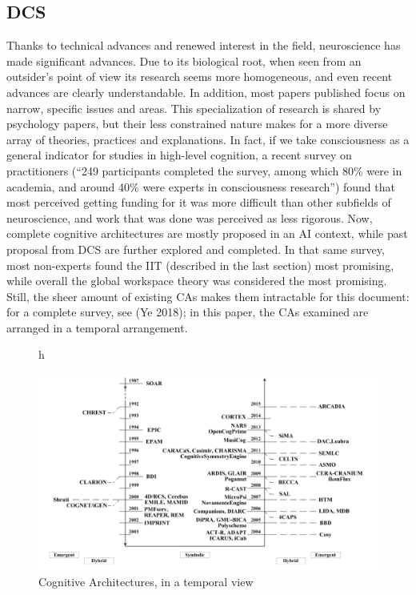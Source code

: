 \documentclass[../main.tex]{subfiles}
\begin{document}
\subsection{DCS}
Thanks to technical advances and renewed interest in the field, neuroscience has made significant advances. Due to its biological root, when seen from an outsider's point of view its research seems more homogeneous, and even recent advances are clearly understandable. In addition, most papers published focus on narrow, specific issues and areas. This specialization of research is shared by psychology papers, but their less constrained nature makes for a more diverse array of theories, practices and explanations. In fact, if we take consciousness as a general indicator for studies in high-level cognition, a recent survey\cite{michelInformalInternetSurvey2018} on practitioners (``249 participants completed the survey, among which 80\% were in academia, and around 40\% were experts in consciousness research'') found that most perceived getting funding for it was more difficult than other subfields of neuroscience, and work that was done was perceived as less rigorous. Now, complete cognitive architectures are mostly proposed in an AI context, while past proposal from DCS are further explored and completed. In that same survey, most non-experts found the IIT (described in the last section) most promising, while overall the global workspace theory was considered the most promising.  Still, the sheer amount of existing CAs makes them intractable for this document: for a complete survey, see (Ye 2018)\cite{yeSurveyCognitiveArchitectures2018}; in this paper, the CAs examined are arranged in a temporal arrangement.

\begin{figure}{h}
    \caption{Cognitive Architectures, in a temporal view\cite{yeSurveyCognitiveArchitectures2018} }
    \includegraphics[width=\textwidth]{img/CAs.png}
\end{figure}
\end{document}
